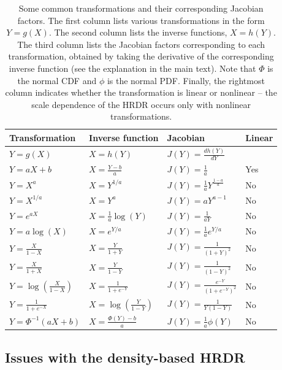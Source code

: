 \documentclass[9pt,twocolumn,twoside]{cidlab-draft}\templatetype{cidlab-invited}
\newcommand{\hdr}{HRDR}
\begin{document}
\begin{table}[bt]
\centering 
\caption{Some common transformations and their corresponding Jacobian factors. The first column lists various transformations in the form $Y=g(X)$. The second column lists the inverse functions, $X=h(Y)$. The third column lists the Jacobian factors corresponding to each transformation, obtained by taking the derivative of the corresponding inverse function (see the explanation in the main text). Note that $\Phi$ is the normal CDF and $\phi$ is the normal PDF. Finally, the rightmost column indicates whether the transformation is linear or nonlinear -- the scale dependence of the \hdr{} occurs only with nonlinear transformations.}
\label{tab:transformations}
\begin{tabular}{llll}\hline
Transformation & Inverse function & Jacobian & Linear  \\ \hline
$Y = g(X)$ & $X = h(Y)$ & $J(Y) =\frac{dh(Y)}{dY}$ &  \\\hline
$Y=aX +b$  & $X= \frac{Y-b}{a}$ & $J(Y)=\frac{1}{a}$ & Yes \\
$Y= X^a$   & $X = Y^{1/a}$      & $J(Y)=\frac{1}{a} Y^{\frac{1-a}{a}}$ & No \\
$Y= X^{1/a}$ & $X = Y^{a}$ & $J(Y)=a Y^{a-1}$ & No \\
$Y = e^{aX}$ & $X = \frac{1}{a}\log(Y)$ & $J(Y)=\frac{1}{aY}$& No \\
$Y = a\log(X)$  & $X = e^{Y/a}$ & $J(Y)=\frac{1}{a}e^{Y/a}$& No \\
$Y = \frac{X}{1-X}$ & $X = \frac{Y}{1+Y}$  & $J(Y)=\frac{1}{(1+Y)^2}$ & No\\
$Y = \frac{X}{1+X}$ & $X = \frac{Y}{1-Y}$ & $J(Y)=\frac{1}{(1-Y)^2}$& No\\
$Y = \log\left(\frac{X}{1-X}\right)$ & $X = \frac{1}{1+e^{-Y}}$ & $J(Y)=\frac{e^{-Y}}{\left(1+e^{-Y}\right)^2}$& No \\
$Y = \frac{1}{1+e^{-X}}$ & $X = \log\left(\frac{Y}{1-Y}\right)$ & $J(Y)=\frac{1}{Y(1-Y)}$& No\\
$Y = \Phi^{-1}(aX+b)$ & $X = \frac{\Phi(Y)-b}{a}$  & $J(Y)=\frac{1}{a}\phi(Y)$& No\\[.5ex]\hline
\end{tabular}
\end{table}

\subsection*{Issues with the density-based \hdr{}}
\end{document}
